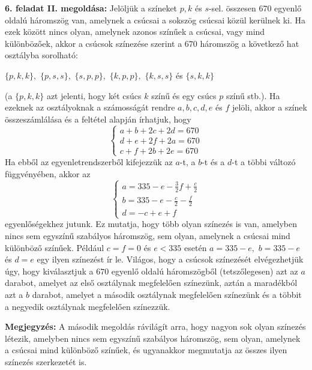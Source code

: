 \documentclass[a4paper,10pt]{article}
\begin{document}
\medskip

{\bf 6. feladat II. megoldása: } Jelöljük a színeket $p,k$ és
$s$-sel. összesen $670$ egyenlő oldalú háromszög van,
amelynek a csúcsai a sokszög csú\-csai közül kerülnek
ki. Ha ezek között nincs olyan, amelynek azonos színűek a
csúcsai, vagy mind különbözőek, akkor a csú\-csok
szí\-ne\-zése szerint a $670$ háromszög a következő hat
osztályba sorolható:

\centerline{$\{p,k,k\},$ $\{p,s,s\},$ $\{s,p,p\},$ $\{k,p,p\},$
$\{k,s,s\}$ és $\{s,k,k\}$}

\noindent (a $\{p,k,k\}$ azt jelenti, hogy két csúcs $k$
színű és egy csúcs $p$ színű stb.). Ha ezeknek az
osztályoknak a számosságát rendre $a,b,c,d,e$ és  $f$
jelöli, akkor a színek összeszámlálása és a feltétel
alapján írhatjuk, hogy
\begin{equation}\left \{ \begin{array}{ccc}
a+b+2c+2d=670\\
d+e+2f+2a=670\\
c+f+2b+2e=670
\end{array}
\right .
\end{equation}
Ha ebből az egyenletrendszerből kifejezzük az $a$-t, a $b$-t
és a $d$-t a többi változó függvényében, akkor az
\begin{equation}\left \{ \begin{array}{l}
a=335-e-\frac 32 f+\frac c2\\
b=335-e-\frac c2 -\frac f2\\
d=-c+e+f
\end{array}
\right .
\end{equation}
 egyenlőségekhez jutunk. Ez mutatja, hogy több olyan
 színezés is van, amelyben nincs sem egyszínű szabályos
 háromszög, sem olyan, amelynek a csúcsai mind különböz\H
 o színűek. Például $c=f=0$ és $e<335$ esetén
 $a=335-e,$ $b=335-e$ és $d=e$ egy ilyen színezést ír le.
 Világos, hogy a csúcsok színezését elvégezhetjük
 úgy, hogy kiválasztjuk a $670$ egyenlő oldalú
 háromszögből (tetszőlegesen) azt az $a$ darabot, amelyet
 az első osztálynak megfelelően színezünk, aztán a
 maradékból azt a $b$ darabot, amelyet a második osztálynak
 megfelelően színezünk és a többit a negyedik
 osztálynak megfelelően színezzük.

\medskip

\textbf{Megjegyzés: } A második megoldás rávilágít arra, hogy nagyon
sok olyan színezés létezik, amelyben nincs sem egyszínű
szabályos
 háromszög, sem olyan, amelynek a csúcsai mind különböz\H
 o színűek, és ugyanakkor megmutatja az összes ilyen színezés
 szer\-kezetét is.
\end{document}
